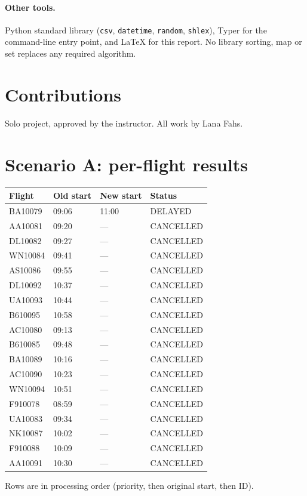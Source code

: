 \documentclass[11pt]{article}
\begin{document}
\paragraph{Other tools.}
Python standard library (\texttt{csv}, \texttt{datetime}, \texttt{random},
\texttt{shlex}), Typer for the command-line entry point, and \LaTeX{} for
this report. No library sorting, map or set replaces any required algorithm.

\section{Contributions}
Solo project, approved by the instructor. All work by Lana Fahs.


\clearpage
\appendix
\section{Scenario A: per-flight results}\label{app:scenario}
\begin{center}
\small
\begin{tabular}{@{}llll@{}}
\toprule
Flight & Old start & New start & Status \\
\midrule
BA10079 & 09:06 & 11:00 & DELAYED \\
AA10081 & 09:20 & --- & CANCELLED \\
DL10082 & 09:27 & --- & CANCELLED \\
WN10084 & 09:41 & --- & CANCELLED \\
AS10086 & 09:55 & --- & CANCELLED \\
DL10092 & 10:37 & --- & CANCELLED \\
UA10093 & 10:44 & --- & CANCELLED \\
B610095 & 10:58 & --- & CANCELLED \\
AC10080 & 09:13 & --- & CANCELLED \\
B610085 & 09:48 & --- & CANCELLED \\
BA10089 & 10:16 & --- & CANCELLED \\
AC10090 & 10:23 & --- & CANCELLED \\
WN10094 & 10:51 & --- & CANCELLED \\
F910078 & 08:59 & --- & CANCELLED \\
UA10083 & 09:34 & --- & CANCELLED \\
NK10087 & 10:02 & --- & CANCELLED \\
F910088 & 10:09 & --- & CANCELLED \\
AA10091 & 10:30 & --- & CANCELLED \\
\bottomrule
\end{tabular}
\end{center}
Rows are in processing order (priority, then original start, then ID).
\end{document}
